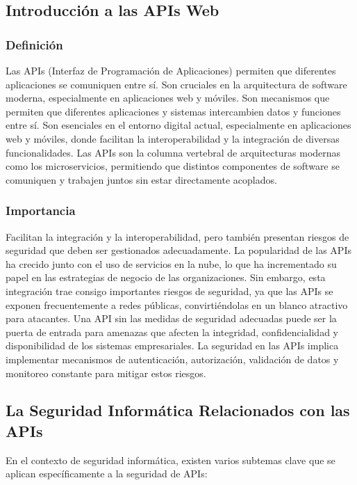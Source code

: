 \documentclass{article}
\begin{document}
    \subsection{Introducción a las APIs Web}
    \subsubsection{Definición}
    Las APIs (Interfaz de Programación de Aplicaciones) permiten que diferentes aplicaciones se comuniquen entre sí. Son cruciales en la arquitectura de software moderna, especialmente en aplicaciones web y móviles. Son mecanismos que permiten que diferentes aplicaciones y sistemas intercambien datos y funciones entre sí. Son esenciales en el entorno digital actual, especialmente en aplicaciones web y móviles, donde facilitan la interoperabilidad y la integración de diversas funcionalidades. Las APIs son la columna vertebral de arquitecturas modernas como los microservicios, permitiendo que distintos componentes de software se comuniquen y trabajen juntos sin estar directamente acoplados.

    \subsubsection{Importancia}
    Facilitan la integración y la interoperabilidad, pero también presentan riesgos de seguridad que deben ser gestionados adecuadamente. La popularidad de las APIs ha crecido junto con el uso de servicios en la nube, lo que ha incrementado su papel en las estrategias de negocio de las organizaciones. Sin embargo, esta integración trae consigo importantes riesgos de seguridad, ya que las APIs se exponen frecuentemente a redes públicas, convirtiéndolas en un blanco atractivo para atacantes. Una API sin las medidas de seguridad adecuadas puede ser la puerta de entrada para amenazas que afecten la integridad, confidencialidad y disponibilidad de los sistemas empresariales. La seguridad en las APIs implica implementar mecanismos de autenticación, autorización, validación de datos y monitoreo constante para mitigar estos riesgos.

    \subsection{La Seguridad Informática Relacionados con las APIs}
    En el contexto de seguridad informática, existen varios subtemas clave que se aplican específicamente a la seguridad de APIs:
\end{document}
